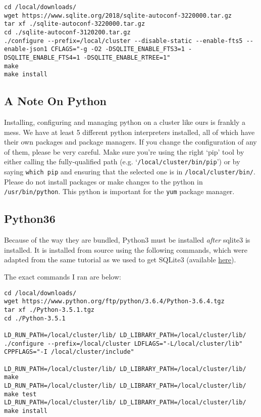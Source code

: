 \documentclass[]{book}
\begin{document}
\begin{verbatim}
cd /local/downloads/
wget https://www.sqlite.org/2018/sqlite-autoconf-3220000.tar.gz
tar xf ./sqlite-autoconf-3220000.tar.gz
cd ./sqlite-autoconf-3120200.tar.gz
./configure --prefix=/local/cluster --disable-static --enable-fts5 --enable-json1 CFLAGS="-g -O2 -DSQLITE_ENABLE_FTS3=1 -DSQLITE_ENABLE_FTS4=1 -DSQLITE_ENABLE_RTREE=1"
make
make install
\end{verbatim}

\subsection{A Note On Python}\label{a-note-on-python}

Installing, configuring and managing python on a cluster like ours is
frankly a mess. We have at least 5 different python interpreters
installed, all of which have their own packages and package managers. If
you change the configuration of any of them, please be very careful.
Make sure you're using the right `pip' tool by either calling the
fully-qualified path (e.g. `\texttt{/local/cluster/bin/pip}') or by
saying \texttt{which\ pip} and ensuring that the selected one is in
\texttt{/local/cluster/bin/}. Please do not install packages or make
changes to the python in \texttt{/usr/bin/python}. This python is
important for the \texttt{yum} package manager.

\subsection{Python36}\label{python36}

Because of the way they are bundled, Python3 must be installed
\emph{after} sqlite3 is installed. It is installed from source using the
following commands, which were adapted from the same tutorial as we used
to get SQLite3 (available
\href{https://bluebill.net/2016/04/24/install-python-and-sqlite-from-source/}{here}).

The exact commands I ran are below:

\begin{verbatim}
cd /local/downloads/
wget https://www.python.org/ftp/python/3.6.4/Python-3.6.4.tgz
tar xf ./Python-3.5.1.tgz
cd ./Python-3.5.1

LD_RUN_PATH=/local/cluster/lib/ LD_LIBRARY_PATH=/local/cluster/lib/ ./configure --prefix=/local/cluster LDFLAGS="-L/local/cluster/lib" CPPFLAGS="-I /local/cluster/include"

LD_RUN_PATH=/local/cluster/lib/ LD_LIBRARY_PATH=/local/cluster/lib/ make
LD_RUN_PATH=/local/cluster/lib/ LD_LIBRARY_PATH=/local/cluster/lib/ make test
LD_RUN_PATH=/local/cluster/lib/ LD_LIBRARY_PATH=/local/cluster/lib/ make install
\end{verbatim}
\end{document}
